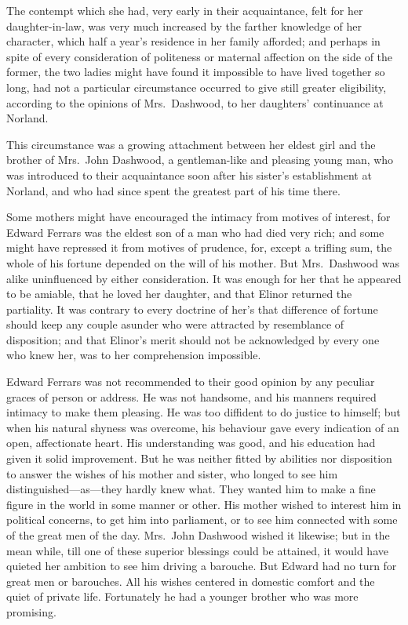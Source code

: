 The contempt which she had, very early in their acquaintance,
felt for her daughter-in-law, was very much increased
by the farther knowledge of her character, which half
a year's residence in her family afforded; and perhaps
in spite of every consideration of politeness or maternal
affection on the side of the former, the two ladies might
have found it impossible to have lived together so long,
had not a particular circumstance occurred to give
still greater eligibility, according to the opinions
of Mrs.\ Dashwood, to her daughters' continuance at Norland.

This circumstance was a growing attachment between
her eldest girl and the brother of Mrs.\ John Dashwood,
a gentleman-like and pleasing young man, who was introduced
to their acquaintance soon after his sister's establishment
at Norland, and who had since spent the greatest part
of his time there.

Some mothers might have encouraged the intimacy from
motives of interest, for Edward Ferrars was the eldest son
of a man who had died very rich; and some might have repressed
it from motives of prudence, for, except a trifling sum,
the whole of his fortune depended on the will of his mother.
But Mrs.\ Dashwood was alike uninfluenced by either consideration.
It was enough for her that he appeared to be amiable,
that he loved her daughter, and that Elinor returned
the partiality.  It was contrary to every doctrine of
her's that difference of fortune should keep any couple
asunder who were attracted by resemblance of disposition;
and that Elinor's merit should not be acknowledged
by every one who knew her, was to her comprehension impossible.

Edward Ferrars was not recommended to their good
opinion by any peculiar graces of person or address.
He was not handsome, and his manners required intimacy
to make them pleasing.  He was too diffident to do justice
to himself; but when his natural shyness was overcome,
his behaviour gave every indication of an open,
affectionate heart.  His understanding was good,
and his education had given it solid improvement.
But he was neither fitted by abilities nor disposition
to answer the wishes of his mother and sister, who longed
to see him distinguished---as---they hardly knew what.
They wanted him to make a fine figure in the world in some
manner or other.  His mother wished to interest him in
political concerns, to get him into parliament, or to see
him connected with some of the great men of the day.
Mrs.\ John Dashwood wished it likewise; but in the mean while,
till one of these superior blessings could be attained, it would
have quieted her ambition to see him driving a barouche.
But Edward had no turn for great men or barouches.
All his wishes centered in domestic comfort and the quiet
of private life.  Fortunately he had a younger brother
who was more promising.

